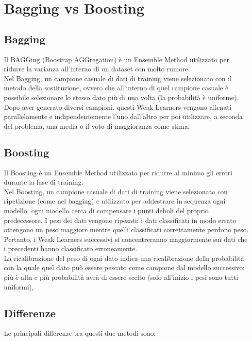 \section{Bagging vs Boosting}
    \subsection{Bagging}
        Il BAGGing (Boostrap AGGregation) è un Ensemble Method utilizzato per ridurre la varianza all'interno di un dataset con molto rumore.
        \\[1\baselineskip]
        Nel Bagging, un campione casuale di dati di training viene selezionato con il metodo della sostituzione, ovvero che all'interno di quel campione casuale è possibile selezionare lo stesso dato più di una volta (la probabilità è uniforme).
        Dopo aver generato diversi campioni, questi Weak Learners vengono allenati parallelamente e indipendentemente l'uno dall'altro per poi utilizzare, a seconda del problema, una media o il voto di maggioranza come stima.

    \subsection{Boosting}
        Il Boosting è un Ensemble Method utilizzato per ridurre al minimo gli errori durante la fase di training.
        \\[1\baselineskip]
        Nel Boosting, un campione casuale di dati di training viene selezionato con ripetizione (come nel bagging) e utilizzato per addestrare in sequenza ogni modello: ogni modello cerca di compensare i punti deboli del proprio predecessore.
        I pesi dei dati vengono ripesati: i dati classificati in modo errato ottengono un peso maggiore mentre quelli classificati correttamente perdono peso. Pertanto, i Weak Learners successivi si concentreranno maggiormente sui dati che i precedenti hanno classificato erroneamente.
        \\[1\baselineskip]
        La ricalibrazione del peso di ogni dato indica una ricalibrazione della probabilità con la quale quel dato può essere pescato come campione dal modello successivo: più è alta e più probabilità avrà di essere scelto (solo all'inizio i pesi sono tutti uniformi),

    \subsection{Differenze}
        Le principali differenze tra questi due metodi sono:
        
